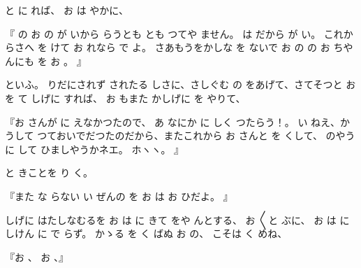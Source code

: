 と
に
れば、
お
は
やかに、

『
の
お
の
が
いから
らうとも
とも
つてや
ません。
は
だから
が
い。
これからさへ
を
けて
お
れなら
で
よ。
さあもうをかしな
を
ないで
お
の
の
お
ちやんにも
を
お
。
』

といふ。
りだにされず
されたる
しさに、さしぐむ
の
をあげて、さてそつと
お
を
て
しげに
すれば、
お
もまた
かしげに
を
やりて、

『お
さんが
に
えなかつたので、
あ
なにか
に
しく
つたらう！。
い
ねえ、かうして
つておいでだつたのだから、またこれから
お
さんと
を
くして、
のやうに
して
ひましやうかネエ。
ホヽヽ。
』

と
きことを
り
く。

『また
な
らない
い
ぜんの
を
お
は
お
ひだよ。
』

しげに
はたしなむるを
お
は
に
きて
をや
んとする、
お
〳〵と
ぶに、
お
は
にしけん
に
で
らず。
かゝる
を
く
ばぬ
お
の、
こそは
く
めね、

『お
、
お
、』

